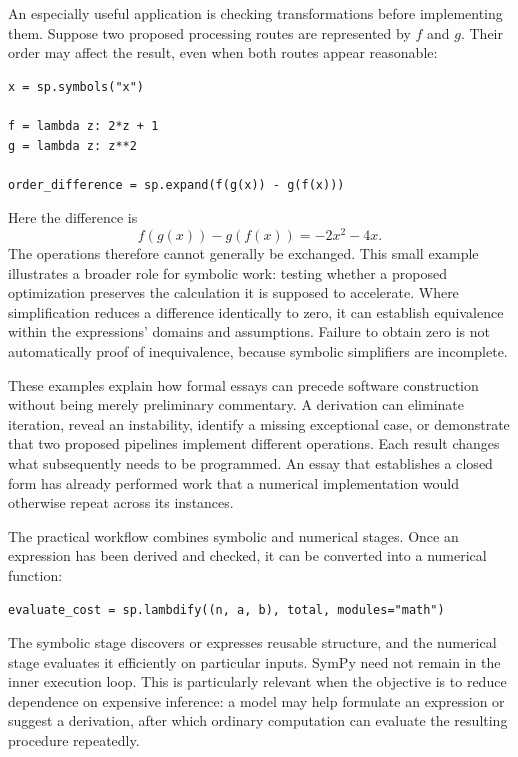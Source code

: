 \documentclass[11pt]{article}
\theoremstyle{remark}
\begin{document}
An especially useful application is checking transformations before implementing them. Suppose two proposed processing routes are represented by $f$ and $g$. Their order may affect the result, even when both routes appear reasonable:
\begin{verbatim}
x = sp.symbols("x")

f = lambda z: 2*z + 1
g = lambda z: z**2

order_difference = sp.expand(f(g(x)) - g(f(x)))
\end{verbatim}
Here the difference is
\begin{equation}
f(g(x)) - g(f(x)) = -2x^2 - 4x.
\end{equation}
The operations therefore cannot generally be exchanged. This small example illustrates a broader role for symbolic work: testing whether a proposed optimization preserves the calculation it is supposed to accelerate. Where simplification reduces a difference identically to zero, it can establish equivalence within the expressions' domains and assumptions. Failure to obtain zero is not automatically proof of inequivalence, because symbolic simplifiers are incomplete.

These examples explain how formal essays can precede software construction without being merely preliminary commentary. A derivation can eliminate iteration, reveal an instability, identify a missing exceptional case, or demonstrate that two proposed pipelines implement different operations. Each result changes what subsequently needs to be programmed. An essay that establishes a closed form has already performed work that a numerical implementation would otherwise repeat across its instances.

The practical workflow combines symbolic and numerical stages. Once an expression has been derived and checked, it can be converted into a numerical function:
\begin{verbatim}
evaluate_cost = sp.lambdify((n, a, b), total, modules="math")
\end{verbatim}
The symbolic stage discovers or expresses reusable structure, and the numerical stage evaluates it efficiently on particular inputs. SymPy need not remain in the inner execution loop. This is particularly relevant when the objective is to reduce dependence on expensive inference: a model may help formulate an expression or suggest a derivation, after which ordinary computation can evaluate the resulting procedure repeatedly.
\end{document}
